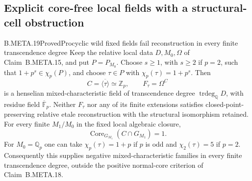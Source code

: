 \subsection{Explicit core-free local fields with a structural-cell obstruction}

\begin{claim}{B.META.19}{Proved}{Procyclic wild fixed fields fail reconstruction in every finite transcendence degree}
Keep the relative local data $D,M_0,\Omega$ of
Claim~B.META.15, and put $P=P_{M_0}$.
Choose $s\ge1$, with $s\ge2$ if $p=2$, such that
$1+p^s\in\chi_p(P)$, and choose
$\tau\in P$ with $\chi_p(\tau)=1+p^s$.
Then
\[
 C=\overline{\langle\tau\rangle}\simeq\mathbb Z_p,
 \qquad F_\tau=\Omega^C                                      \tag{META.PC1}
\]
is a henselian mixed-characteristic field of
transcendence degree $\operatorname{trdeg}_{\mathbb Q}D$,
with residue field $\overline{\mathbb F}_p$.
Neither $F_\tau$ nor any of its finite extensions
satisfies closed-point-preserving relative etale
reconstruction with the structural isomorphism retained.
For every finite $M_1/M_0$ in the fixed local algebraic closure,
\[
       \operatorname{Core}_{G_{M_1}}(C\cap G_{M_1})=1.
                                                               \tag{META.PC2}
\]
For $M_0=\mathbb Q_p$ one can take
$\chi_p(\tau)=1+p$ if $p$ is odd and
$\chi_2(\tau)=5$ if $p=2$.
Consequently this supplies negative mixed-characteristic
families in every finite transcendence degree, outside
the positive normal-core criterion of Claim~B.META.18.
\end{claim}
